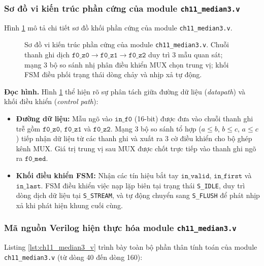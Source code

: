 \subsubsection*{Sơ đồ vi kiến trúc phần cứng của module \texttt{ch11\_median3.v}}
Hình \ref{fig:ch11_median3_arch} mô tả chi tiết sơ đồ khối phần cứng của module \texttt{ch11\_median3.v}.

\begin{figure}[htbp]
    \centering
    
    \caption{Sơ đồ vi kiến trúc phần cứng của module \texttt{ch11\_median3.v}. Chuỗi thanh ghi dịch $\texttt{f0\_z0} \to \texttt{f0\_z1} \to \texttt{f0\_z2}$ duy trì 3 mẫu quan sát; mạng 3 bộ so sánh nhị phân điều khiển MUX chọn trung vị; khối FSM điều phối trạng thái dòng chảy và nhịp xả tự động.}
    \label{fig:ch11_median3_arch}
\end{figure}

\textbf{Đọc hình.} Hình \ref{fig:ch11_median3_arch} thể hiện rõ sự phân tách giữa đường dữ liệu (\emph{datapath}) và khối điều khiển (\emph{control path}):
\begin{itemize}
    \item \textbf{Đường dữ liệu:} Mẫu ngõ vào $\texttt{in\_f0}$ (16-bit) được đưa vào chuỗi thanh ghi trễ gồm $\texttt{f0\_z0}$, $\texttt{f0\_z1}$ và $\texttt{f0\_z2}$. Mạng 3 bộ so sánh tổ hợp ($a \le b$, $b \le c$, $a \le c$) tiếp nhận dữ liệu từ các thanh ghi và xuất ra 3 cờ điều khiển cho bộ ghép kênh MUX. Giá trị trung vị sau MUX được chốt trực tiếp vào thanh ghi ngõ ra $\texttt{f0\_med}$.
    \item \textbf{Khối điều khiển FSM:} Nhận các tín hiệu bắt tay $\texttt{in\_valid}$, $\texttt{in\_first}$ và $\texttt{in\_last}$. FSM điều khiển việc nạp lặp biên tại trạng thái \texttt{S\_IDLE}, duy trì dòng dịch dữ liệu tại \texttt{S\_STREAM}, và tự động chuyển sang \texttt{S\_FLUSH} để phát nhịp xả khi phát hiện khung cuối cùng.
\end{itemize}

\subsubsection*{Mã nguồn Verilog hiện thực hóa module \texttt{ch11\_median3.v}}
Listing \ref{lst:ch11_median3_v} trình bày toàn bộ phần thân tính toán của module \texttt{ch11\_median3.v} (từ dòng 40 đến dòng 160):



